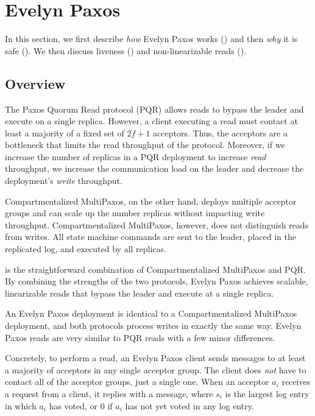 \section{Evelyn Paxos}
In this section, we first describe \emph{how} Evelyn Paxos works
() and then \emph{why} it is safe
(). We then discuss liveness
() and non-linearizable reads
().

\subsection{Overview}
The Paxos Quorum Read protocol (PQR) allows reads to bypass the leader and
execute on a single replica. However, a client executing a read must contact at
least a majority of a fixed set of $2f+1$ acceptors. Thus, the acceptors are a
bottleneck that limits the read throughput of the protocol. Moreover, if we
increase the number of replicas in a PQR deployment to increase \emph{read}
throughput, we increase the communication load on the leader and decrease the
deployment's \emph{write} throughput.

Compartmentalized MultiPaxos, on the other hand, deploys multiple acceptor
groups and can scale up the number replicas without impacting write throughput.
Compartmentalized MultiPaxos, however, does not distinguish reads from writes.
All state machine commands are sent to the leader, placed in the replicated
log, and executed by all replicas.

 is the straightforward combination of Compartmentalized
MultiPaxos and PQR. By combining the strengths of the two protocols, Evelyn
Paxos achieves scalable, linearizable reads that bypass the leader and execute
at a single replica.

An Evelyn Paxos deployment is identical to a Compartmentalized MultiPaxos
deployment, and both protocols process writes in exactly the same way. Evelyn
Paxos reads are very similar to PQR reads with a few minor differences.

Concretely, to perform a read, an Evelyn Paxos client sends 
messages to at least a majority of acceptors in any single acceptor group. The
client does \emph{not} have to contact all of the acceptor groups, just a
single one.
%
When an acceptor $a_i$ receives a  request from a client, it
replies with a  message, where $s_i$ is the largest log
entry in which $a_i$ has voted, or $0$ if $a_i$ has not yet voted in any log
entry.

